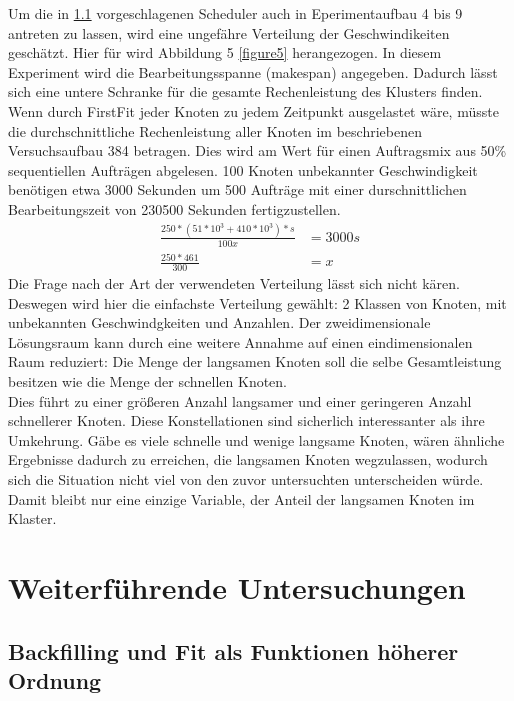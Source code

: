 Um die in \ref{chap:higher-order} vorgeschlagenen Scheduler auch in Eperimentaufbau 4 bis 9 antreten zu lassen, wird eine ungefähre Verteilung der Geschwindikeiten geschätzt.
Hier für wird Abbildung 5 \ref{figure5} herangezogen. In diesem Experiment wird die Bearbeitungsspanne (makespan) angegeben. Dadurch lässt sich eine untere Schranke für die gesamte Rechenleistung des Klusters finden. Wenn durch FirstFit jeder Knoten zu jedem Zeitpunkt ausgelastet wäre, müsste die durchschnittliche Rechenleistung aller Knoten im beschriebenen Versuchsaufbau 384 betragen. Dies wird am Wert für einen Auftragsmix aus 50\% sequentiellen Aufträgen abgelesen. 100 Knoten unbekannter Geschwindigkeit benötigen etwa 3000 Sekunden um 500 Aufträge mit einer durschnittlichen Bearbeitungszeit von 230500 Sekunden fertigzustellen.
\begin{align*}
\frac{250*(51* 10^3 + 410*10^3)*s}{100x} &= 3000s \\
\frac{250*461}{300} &= x
\end{align*}
Die Frage nach der Art der verwendeten Verteilung lässt sich nicht kären. Deswegen wird hier die einfachste Verteilung gewählt: 2 Klassen von Knoten, mit unbekannten Geschwindgkeiten und Anzahlen. Der zweidimensionale Lösungsraum kann durch eine weitere Annahme auf einen eindimensionalen Raum reduziert: Die Menge der langsamen Knoten soll die selbe Gesamtleistung besitzen wie die Menge der schnellen Knoten.\\
Dies führt zu einer größeren Anzahl langsamer und einer geringeren Anzahl schnellerer Knoten. Diese Konstellationen sind sicherlich interessanter als ihre Umkehrung. Gäbe es viele schnelle und wenige langsame Knoten, wären ähnliche Ergebnisse dadurch zu erreichen, die langsamen Knoten wegzulassen, wodurch sich die Situation nicht viel von den zuvor untersuchten unterscheiden würde.\\
Damit bleibt nur eine einzige Variable, der Anteil der langsamen Knoten im Klaster.



\FloatBarrier
\section{Weiterführende Untersuchungen}

\subsection{Backfilling und Fit als Funktionen höherer Ordnung}
\label{chap:higher-order}

